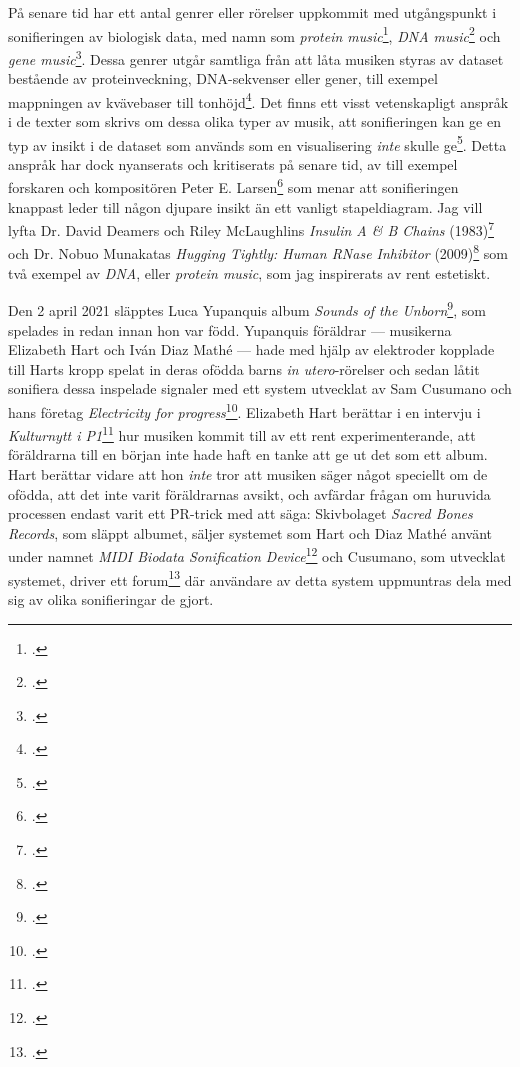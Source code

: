 \documentclass[11pt, a4paper]{article} %
\begin{document}
På senare tid har ett antal genrer eller rörelser uppkommit med utgångspunkt i sonifieringen av biologisk data, med namn som \emph{protein music}\footcite{king_pm_1996}, \emph{DNA music}\footcite{k_kawazoe_study_2001} och \emph{gene music}\footcite{munakata_gene_1995}. Dessa genrer utgår samtliga från att låta musiken styras av dataset bestående av proteinveckning, DNA-sekvenser eller gener, till exempel mappningen av kvävebaser till tonhöjd\footcite{shi_electronic_2007}. Det finns ett visst vetenskapligt anspråk i de texter som skrivs om dessa olika typer av musik, att sonifieringen kan ge en typ av insikt i de dataset som används som en visualisering \emph{inte} skulle ge\footcite{king_pm_1996}. Detta anspråk har dock nyanserats och kritiserats på senare tid, av till exempel forskaren och kompositören Peter E. Larsen\footcite{larsen_more_2016} som menar att sonifieringen knappast leder till någon djupare insikt än ett vanligt stapeldiagram. Jag vill lyfta Dr. David Deamers och Riley McLaughlins \emph{Insulin A \& B Chains} (1983)\footcite{deamer_insulin_1983} och Dr. Nobuo Munakatas \emph{Hugging Tightly: Human RNase Inhibitor} (2009)\footcite{munakata_hugging_2009} som två exempel av \emph{DNA}, eller \emph{protein music}, som jag inspirerats av rent estetiskt.

Den 2 april 2021 släpptes Luca Yupanquis album \emph{Sounds of the Unborn}\footcite{yupanqui_sounds_2021}, som spelades in redan innan hon var född. Yupanquis föräldrar --- musikerna Elizabeth Hart och Iván Diaz Mathé --- hade med hjälp av elektroder kopplade till Harts kropp spelat in deras ofödda barns \emph{in utero}-rörelser och sedan låtit sonifiera dessa inspelade signaler med ett system utvecklat av Sam Cusumano och hans företag \emph{Electricity for progress}\footcite{noauthor_electricity_nodate}. Elizabeth Hart berättar i en intervju i \emph{Kulturnytt i P1}\footcite{eklund_duo_2021} hur musiken kommit till av ett rent experimenterande, att föräldrarna till en början inte hade haft en tanke att ge ut det som ett album. Hart berättar vidare att hon \emph{inte} tror att musiken säger något speciellt om de ofödda, att det inte varit föräldrarnas avsikt, och avfärdar frågan om huruvida processen endast varit ett PR-trick med att säga:  Skivbolaget \emph{Sacred Bones Records}, som släppt albumet, säljer systemet som Hart och Diaz Mathé använt under namnet \emph{MIDI Biodata Sonification Device}\footcite{noauthor_midi_nodate} och Cusumano, som utvecklat systemet, driver ett forum\footcite{noauthor_biodata_nodate} där användare av detta system uppmuntras dela med sig av olika sonifieringar de gjort. 
\end{document}
